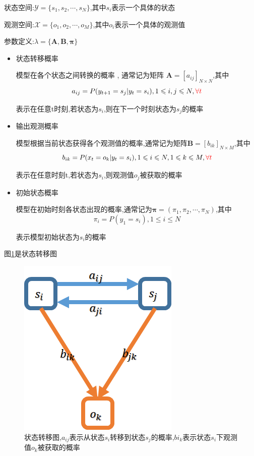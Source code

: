 \documentclass[UTF8,a4paper]{ctexart}%
\begin{document}
            状态空间:$\mathcal{Y} = \{s_1,s_2,\cdots , s_N\}$,其中$s_i$表示一个具体的状态

            观测空间:$\mathcal{X} = \{o_1,o_2,\cdots , o_M\}$,其中$o_i$表示一个具体的观测值

            参数定义:$\lambda = \{\bm{A,B,\pi}\}$
            \begin{itemize}
              \item 状态转移概率

                  模型在各个状态之间转换的概率 , 通常记为矩阵 $\bm{A} = [a_{ij}]_{N\times N}$,其中
                  \[ a_{ij} = P(y_{t+1} = s_j | y_t = s_i) , 1 \leqslant i,j \leqslant N , {\color{red} \forall t }\]

                  表示在任意t时刻,若状态为$s_i$,则在下一个时刻状态为$s_j$的概率

              \item 输出观测概率

                  模型根据当前状态获得各个观测值的概率,通常记为矩阵$\bm{B} = [b_{ik}]_{N\times M}$,其中
                  \[ b_{ik} = P(x_t = o_k | y_t = s_i)  ,1 \leqslant i \leqslant N ,1 \leqslant k \leqslant M ,{\color{red} \forall t }\]

                  表示在任意时刻t,若状态为$s_i$,则观测值$o_j$被获取的概率

              \item 初始状态概率

                  模型在初始时刻各状态出现的概率,通常记为$\bm{\pi} = (\pi_1 , \pi_2 , \cdots ,\pi_N)$,其中
                  \[ \pi_i = P(y_1 = s_i) , 1 \leqslant i \leqslant N \]

                  表示模型初始状态为$s_i$的概率
            \end{itemize}

            图\ref{statusstransferfig}是状态转移图
            \begin{figure}[!htbp]
              \centering
              \includegraphics[scale=0.5]{assets/jiqixuexi4_85f62.png}
              \caption{状态转移图,$a_{ij}$表示从状态$s_i$转移到状态$s_j$的概率,$b{i_k}$表示状态$s_i$下观测值$o_k$被获取的概率}
              \label{statusstransferfig}
            \end{figure}
\end{document}
